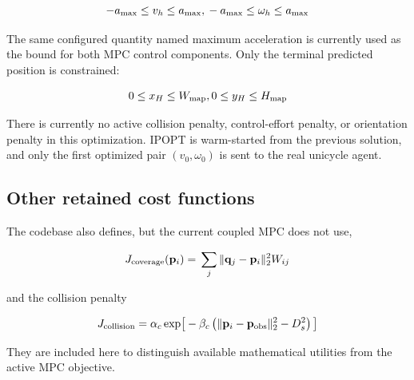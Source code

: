 \documentclass[11pt]{article}
\begin{document}
\begin{equation}
-a_{\max}\le v_h\le a_{\max}, \\
\qquad \\
-a_{\max}\le\omega_h\le a_{\max}
\end{equation}


The same configured quantity named maximum acceleration is currently used as the bound for both MPC control components. Only the terminal predicted position is constrained:


\begin{equation}
0\le x_H\le W_{\mathrm{map}}, \\
\qquad \\
0\le y_H\le H_{\mathrm{map}}
\end{equation}


There is currently no active collision penalty, control-effort penalty, or orientation penalty in this optimization. IPOPT is warm-started from the previous solution, and only the first optimized pair $(v_0,\omega_0)$ is sent to the real unicycle agent.


\subsection{Other retained cost functions}


The codebase also defines, but the current coupled MPC does not use,


\begin{equation}
J_{\mathrm{coverage}}(\mathbf p_i) \\
= \\
\sum_j \\
\lVert\mathbf q_j-\mathbf p_i\rVert_2^2W_{ij}
\end{equation}


and the collision penalty


\begin{equation}
J_{\mathrm{collision}} \\
= \\
\alpha_c \\
\exp\!\left[ \\
-\beta_c \\
\left( \\
\lVert\mathbf p_i-\mathbf p_{\mathrm{obs}}\rVert_2^2-D_s^2 \\
\right) \\
\right]
\end{equation}


They are included here to distinguish available mathematical utilities from the active MPC objective.
\end{document}
